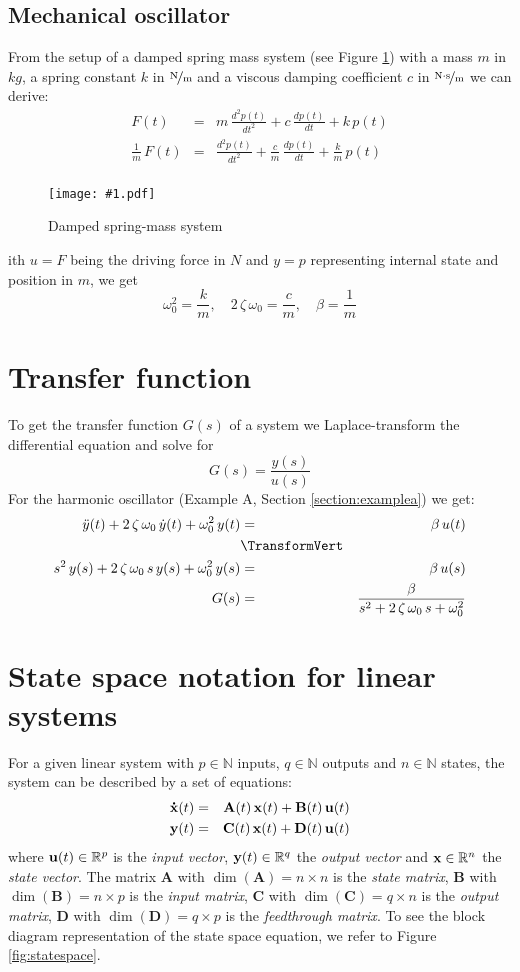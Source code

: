 \documentclass[a4paper,12pt]{article}
\newcommand{\Fig}[4]{%
\begin{figure}[htb]%
\begin{center}%
\texttt{[image: \#1.pdf]}%
\end{center}%
\caption{#3\label{fig:#1}}%
\end{figure}%
}
\newcommand{\FigRef}[1]{Figure \ref{fig:#1}}
\renewcommand{\Vec}[1]{{\bf #1}}
\newcommand{\Mat}[1]{\mathbf{#1}}
\newcommand{\pfrac}[2]{\frac{#1}{#2}}
\newcommand{\Section}[2]{\section{#2}\label{section:#1}}
\newcommand{\SRef}[1]{Section \ref{section:#1}}
\newcommand{\SubSection}[2]{\subsection{#2}\label{subsection:#1}}
\begin{document}
\SubSection{exampleamech}{Mechanical oscillator}

From the setup of a damped spring mass system (see \FigRef{mechoscil}) with a mass $m$ in $\unit{kg}$, a spring constant $k$ in $\unitfrac{N}{m}$ and a viscous damping coefficient $c$ in $\unitfrac{N\cdot s}{m}$ we can derive:
\begin{eqnarray}
F(t)&=&m\,\frac{d^2p(t)}{dt^2}+c\,\frac{dp(t)}{dt}+k\,p(t)\\
\frac{1}{m}\,F(t)&=&\frac{d^2p(t)}{dt^2}+\frac{c}{m}\,\frac{dp(t)}{dt}+\frac{k}{m}\,p(t)\\
\end{eqnarray}

\Fig{mechoscil}{0.5}{Damped spring-mass system}

With $u=F$ being the driving force in $\unit{N}$ and $y=p$ representing internal state and position in $\unit{m}$, we get
\begin{equation}
\omega_0^2=\pfrac{k}{m},\quad2\,\zeta\,\omega_0=\pfrac{c}{m},\quad\beta=\pfrac{1}{m}
\end{equation}

\Section{xferfun}{Transfer function}

To get the transfer function $G(s)$ of a system we Laplace-transform the differential equation and solve for 
\begin{equation}
G(s)=\frac{y(s)}{u(s)}
\end{equation}
For the harmonic oscillator (Example A, \SRef{examplea}) we get:
\begin{eqnarray}
\ddot{y}(t)+2\,\zeta\,\omega_0\,\dot{y}(t)+\omega_0^2\,y(t)&=&\beta\,u(t)\\
&\TransformVert&\nonumber\\
s^2\,y(s)+2\,\zeta\,\omega_0\,s\,y(s)+\omega_0^2\,y(s)&=&\beta\,u(s)\\
G(s)&=&\frac{\beta}{s^2+2\,\zeta\,\omega_0\,s+\omega_0^2}
\end{eqnarray}

\Section{lsystem}{State space notation for linear systems}

For a given linear system with $p\in\mathbb{N}$ inputs, $q\in\mathbb{N}$ outputs and $n\in\mathbb{N}$ states, the system can be described by a set of equations:
\begin{eqnarray}
\Vec{\dot{x}}(t)&=&\Mat{A}(t)\,\Vec{x}(t)+\Mat{B}(t)\,\Vec{u}(t)\\
\Vec{y}(t)&=&\Mat{C}(t)\,\Vec{x}(t)+\Mat{D}(t)\,\Vec{u}(t)
\end{eqnarray}
where $\Vec{u}(t)\in\mathbb{R}^p$ is the {\em input vector}, $\Vec{y}(t)\in\mathbb{R}^q$ the {\em output vector} and $\Vec{x}\in\mathbb{R}^n$ the {\em state vector}. The matrix $\Mat{A}$ with $\dim(\Mat{A})=n\times n$ is the {\em state matrix}, $\Mat{B}$ with $\dim(\Mat{B})=n\times p$ is the {\em input matrix}, $\Mat{C}$ with $\dim(\Mat{C})=q\times n$ is the {\em output matrix}, $\Mat{D}$ with $\dim(\Mat{D})=q\times p$ is the {\em feedthrough matrix}. To see the block diagram representation of the state space equation, we refer to \FigRef{statespace}.\\
\end{document}
